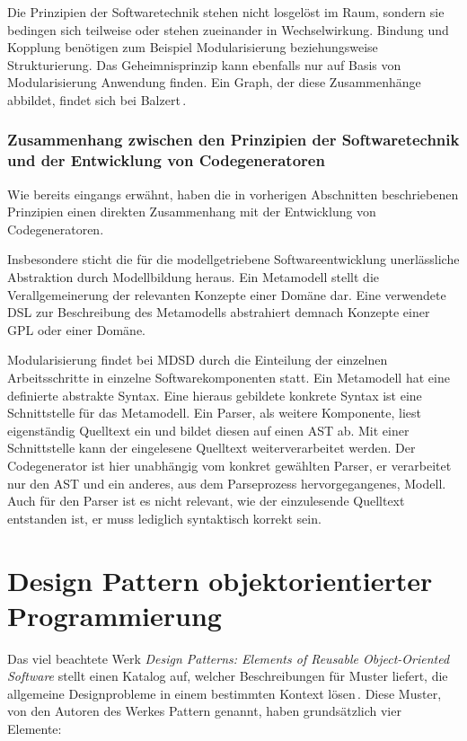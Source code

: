 \documentclass[12pt,oneside,a4paper,parskip]{scrbook}
\begin{document}
Die Prinzipien der Softwaretechnik stehen nicht losgelöst im Raum, sondern sie bedingen sich teilweise oder stehen zueinander in Wechselwirkung. Bindung und Kopplung benötigen zum Beispiel Modularisierung beziehungsweise Strukturierung. Das Geheimnisprinzip kann ebenfalls nur auf Basis von Modularisierung Anwendung finden. Ein Graph, der diese Zusammenhänge abbildet, findet sich bei Balzert\,\cite[S.\,49]{balzert2009a}.

\subsubsection{Zusammenhang zwischen den Prinzipien der Softwaretechnik und der Entwicklung von Codegeneratoren}

Wie bereits eingangs erwähnt, haben die in vorherigen Abschnitten beschriebenen Prinzipien einen direkten Zusammenhang mit der Entwicklung von Codegeneratoren.

Insbesondere sticht die für die modellgetriebene Softwareentwicklung unerlässliche Abstraktion durch Modellbildung heraus. Ein Metamodell stellt die Verallgemeinerung der relevanten Konzepte einer Domäne dar. Eine verwendete DSL zur Beschreibung des Metamodells abstrahiert demnach Konzepte einer GPL oder einer Domäne.

Modularisierung findet bei MDSD durch die Einteilung der einzelnen Arbeitsschritte in einzelne Softwarekomponenten statt. Ein Metamodell hat eine definierte abstrakte Syntax. Eine hieraus gebildete konkrete Syntax ist eine Schnittstelle für das Metamodell. Ein Parser, als weitere Komponente, liest eigenständig Quelltext ein und bildet diesen auf einen AST ab. Mit einer Schnittstelle kann der eingelesene Quelltext weiterverarbeitet werden. Der Codegenerator ist hier unabhängig vom konkret gewählten Parser, er verarbeitet nur den AST und ein anderes, aus dem Parseprozess hervorgegangenes, Modell. Auch für den Parser ist es nicht relevant, wie der einzulesende Quelltext entstanden ist, er muss lediglich syntaktisch korrekt sein.

\section{Design Pattern objektorientierter Programmierung}

Das viel beachtete Werk \textit{Design Patterns: Elements of Reusable Object-Oriented Software} stellt einen Katalog auf, welcher Beschreibungen für Muster liefert, die allgemeine Designprobleme in einem bestimmten Kontext lösen\,\cite{gamma1995}. Diese Muster, von den Autoren des Werkes Pattern genannt, haben grundsätzlich vier Elemente:
\end{document}
